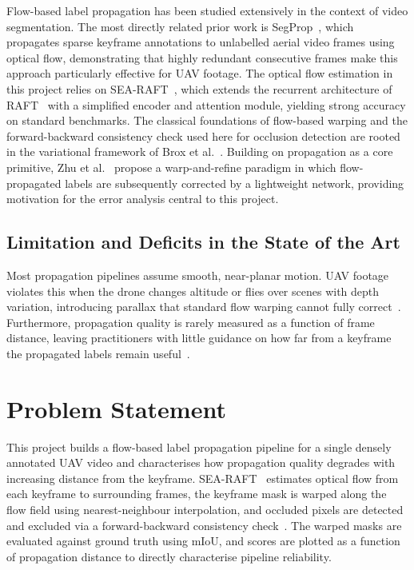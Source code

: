 \documentclass[rnd]{mas_proposal}
\begin{document}
Flow-based label propagation has been studied extensively in the context of
video segmentation. The most directly related prior work is
SegProp~\cite{segprop2020}, which propagates sparse keyframe annotations to
unlabelled aerial video frames using optical flow, demonstrating that highly
redundant consecutive frames make this approach particularly effective for UAV
footage. The optical flow estimation in this project relies on
SEA-RAFT~\cite{searaft2024}, which extends the recurrent architecture of
RAFT~\cite{raft2020} with a simplified encoder and attention module, yielding
strong accuracy on standard benchmarks. The classical foundations of
flow-based warping and the forward-backward consistency check used here for
occlusion detection are rooted in the variational framework of Brox et
al.~\cite{brox2004}. Building on propagation as a core primitive, Zhu et
al.~\cite{zhu2019} propose a warp-and-refine paradigm in which
flow-propagated labels are subsequently corrected by a lightweight network,
providing motivation for the error analysis central to this project.

\subsection{Limitation and Deficits in the State of the Art}

Most propagation pipelines assume smooth, near-planar motion. UAV footage
violates this when the drone changes altitude or flies over scenes with depth
variation, introducing parallax that standard flow warping cannot fully
correct~\cite{segprop2020,zhu2019}. Furthermore, propagation quality is rarely
measured as a function of frame distance, leaving practitioners with little
guidance on how far from a keyframe the propagated labels remain
useful~\cite{raft2020,searaft2024}.

\section{Problem Statement}

This project builds a flow-based label propagation pipeline for a single
densely annotated UAV video and characterises how propagation quality degrades
with increasing distance from the keyframe. SEA-RAFT~\cite{searaft2024}
estimates optical flow from each keyframe to surrounding frames, the keyframe
mask is warped along the flow field using nearest-neighbour interpolation, and
occluded pixels are detected and excluded via a forward-backward consistency
check~\cite{brox2004}. The warped masks are evaluated against ground truth
using mIoU, and scores are plotted as a function of propagation distance to
directly characterise pipeline reliability.
\end{document}
